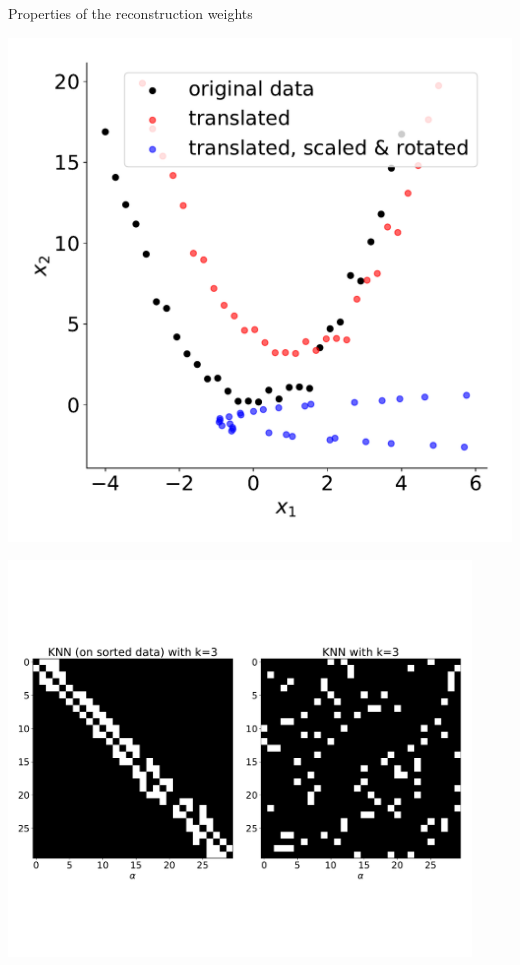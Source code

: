 \begin{frame}{Properties of the reconstruction weights}
\begin{minipage}{0.25\textwidth}
\begin{center}
	\includegraphics[width=1.2\textwidth]{img/parabola_data}
\end{center}
\end{minipage}
\hspace{2mm}
\begin{minipage}{0.7\textwidth}
\begin{center}
	\includegraphics[trim=0 180 0 180, clip, width=0.92\textwidth]{img/parabola_knn}
\end{center}
\end{minipage}

\end{frame}

